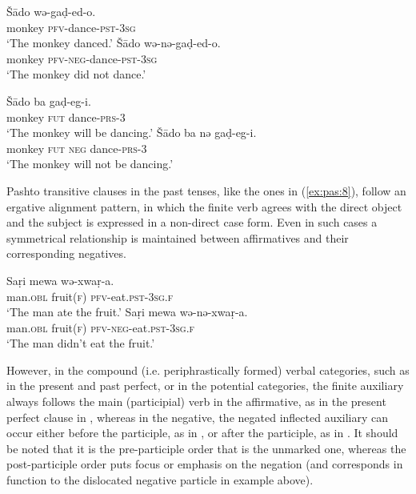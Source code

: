 \documentclass[output=paper,colorlinks,citecolor=brown]{langscibook}
\begin{document}
\ea\label{ex:pas:6}
    \ea\label{ex:pas:6a}
        \gll Š\={a}do wə{}-gaḍ{}-ed-o.\\
             monkey \textsc{pfv}{}-dance-\textsc{pst-3sg}\\
        \glt ‘The monkey danced.’
    \ex\label{ex:pas:6b}
        \gll Š\={a}do wə{}-nə{}-gaḍ{}-ed-o. \\
             monkey \textsc{pfv}{}-\textsc{neg}{}-dance-\textsc{pst-3sg} \\
        \glt ‘The monkey did not dance.’
    \z
\z 

\ea\label{ex:pas:7}
    \ea\label{ex:pas:7a}
        \gll Š\={a}do ba gaḍ{}-eg-i.\\
             monkey \textsc{fut} dance-\textsc{prs-3}\\
        \glt ‘The monkey will be dancing.’ 
    \ex\label{ex:pas:7b}
        \gll Š\={a}do ba nə gaḍ-eg{}-i. \\
             monkey \textsc{fut} \textsc{neg} dance-\textsc{prs-3}\\
        \glt  ‘The monkey will not be dancing.’
    \z
\z 

Pashto transitive clauses in the past tenses, like the ones in (\ref{ex:pas:8}), follow an ergative alignment pattern, in which the finite verb agrees with the direct object and the subject is expressed in a non-direct case form. Even in such cases a symmetrical relationship is maintained between affirmatives and their corresponding negatives. 

\ea\label{ex:pas:8}
    \ea\label{ex:pas:8a}
        \gll Saṛi mewa wə-xwaṛ-a.\\ 
              man.\textsc{obl} fruit(\textsc{f}) \textsc{pfv}{}-eat.\textsc{pst-3sg.f}\\
        \glt ‘The man ate the fruit.’
    \ex\label{ex:pas:8b}
        \gll Saṛi mewa wə-nə{}-xwaṛ-a. \\
             man.\textsc{obl} fruit(\textsc{f}) \textsc{pfv}{}-\textsc{neg}{}-eat.\textsc{pst-3sg.f}\\
        \glt ‘The man didn’t eat the fruit.’
    \z
\z 

However, in the compound (i.e. periphrastically formed) verbal categories, such as in the present and past perfect, or in the potential categories, the finite auxiliary always follows the main (participial) verb in the affirmative, as in the present perfect clause in , whereas in the negative, the negated inflected auxiliary can occur either before the participle, as in , or after the participle, as in . It should be noted that it is the pre-participle order that is the unmarked one, whereas the post-participle order puts focus or emphasis on the negation (and corresponds in function to the dislocated negative particle in example  above). 
\end{document}
